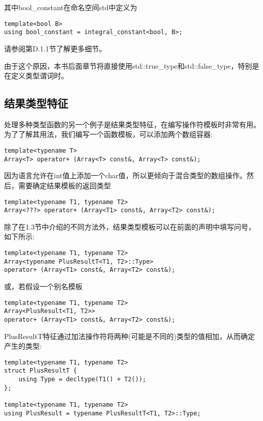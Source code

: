 其中bool\_constant在命名空间std中定义为

\begin{lstlisting}[style=styleCXX]
template<bool B>
using bool_constant = integral_constant<bool, B>;
\end{lstlisting}

请参阅第D.1.1节了解更多细节。

由于这个原因，本书后面章节将直接使用std::true\_type和std::false\_type，特别是在定义类型谓词时。

\subsection{结果类型特征} 

处理多种类型函数的另一个例子是结果类型特征，在编写操作符模板时非常有用。为了了解其用法，我们编写一个函数模板，可以添加两个数组容器:

\begin{lstlisting}[style=styleCXX]
template<typename T>
Array<T> operator+ (Array<T> const&, Array<T> const&);
\end{lstlisting}

因为语言允许在int值上添加一个char值，所以更倾向于混合类型的数组操作。然后，需要确定结果模板的返回类型

\begin{lstlisting}[style=styleCXX]
template<typename T1, typename T2>
Array<???> operator+ (Array<T1> const&, Array<T2> const&);
\end{lstlisting}

除了在1.3节中介绍的不同方法外，结果类型模板可以在前面的声明中填写问号，如下所示:

\begin{lstlisting}[style=styleCXX]
template<typename T1, typename T2>
Array<typename PlusResultT<T1, T2>::Type>
operator+ (Array<T1> const&, Array<T2> const&);
\end{lstlisting}

或，若假设一个别名模板

\begin{lstlisting}[style=styleCXX]
template<typename T1, typename T2>
Array<PlusResult<T1, T2>>
operator+ (Array<T1> const&, Array<T2> const&);
\end{lstlisting}

PlusResultT特征通过加法操作符将两种(可能是不同的)类型的值相加，从而确定产生的类型:

\begin{lstlisting}[style=styleCXX]
template<typename T1, typename T2>
struct PlusResultT {
	using Type = decltype(T1() + T2());
};

template<typename T1, typename T2>
using PlusResult = typename PlusResultT<T1, T2>::Type;
\end{lstlisting}

